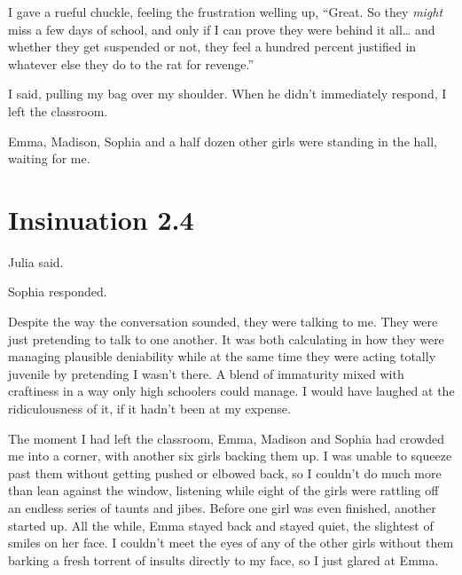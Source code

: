 I gave a rueful chuckle, feeling the frustration welling up, “Great. So they {\em might} miss a few days of school, and only if I can prove they were behind it all\ldots{} and whether they get suspended or not, they feel a hundred percent justified in whatever else they do to the rat for revenge.”


 I said, pulling my bag over my shoulder. When he didn't immediately respond, I left the classroom.

Emma, Madison, Sophia and a half dozen other girls were standing in the hall, waiting for me.


\chapter{Insinuation 2.4}

 Julia said.

 Sophia responded.


Despite the way the conversation sounded, they were talking to me. They were just pretending to talk to one another. It was both calculating in how they were managing plausible deniability while at the same time they were acting totally juvenile by pretending I wasn't there. A blend of immaturity mixed with craftiness in a way only high schoolers could manage. I would have laughed at the ridiculousness of it, if it hadn't been at my expense.

The moment I had left the classroom, Emma, Madison and Sophia had crowded me into a corner, with another six girls backing them up. I was unable to squeeze past them without getting pushed or elbowed back, so I couldn't do much more than lean against the window, listening while eight of the girls were rattling off an endless series of taunts and jibes. Before one girl was even finished, another started up. All the while, Emma stayed back and stayed quiet, the slightest of smiles on her face. I couldn't meet the eyes of any of the other girls without them barking a fresh torrent of insults directly to my face, so I just glared at Emma.


